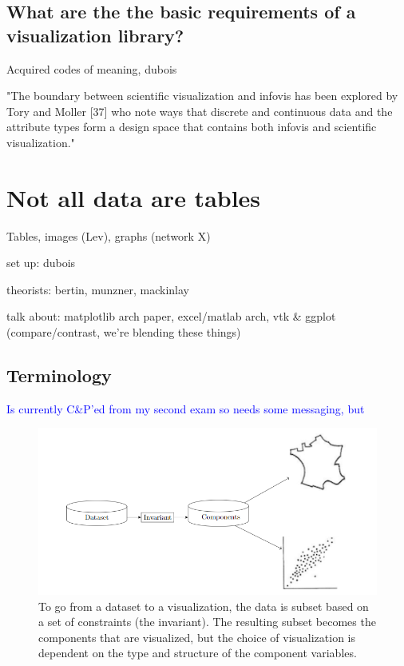 \documentclass[../main.tex]{subfiles}
\begin{document}
\subsection{ What are the the basic requirements of a visualization library?}
Acquired codes of meaning, dubois


"The boundary between scientific visualization and infovis has been explored by Tory and Moller [37] who note ways that discrete and continuous data and the attribute types form a design space that contains both infovis and scientific visualization." \cite{pousmanCasualInformation2007}



\section{Not all data are tables}

Tables, images (Lev), graphs (network X)

set up: dubois

theorists:
bertin, munzner, mackinlay

talk about:
matplotlib arch paper, excel/matlab arch, 
vtk \& ggplot (compare/contrast, we're blending these things) 


\subsection{Terminology}
\textcolor{blue}{Is currently C\&P'ed from my second exam so needs some messaging, but }
\begin{figure}[h!]
\includegraphics[width=\textwidth]{figures/intro/flowchart.png} 
\caption{To go from a dataset to a visualization, the data is subset based on a set of constraints (the invariant). The resulting subset becomes the components that are visualized, but the choice of visualization is dependent on the type and structure of the component variables.}
\label{fig:flowchart}
\end{figure}
\end{document}
